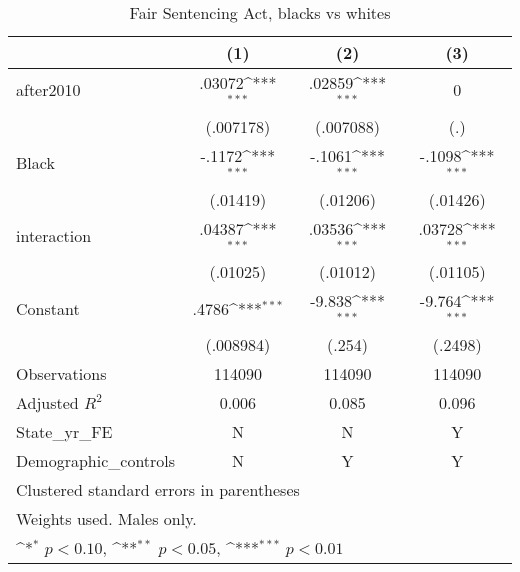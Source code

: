 \begin{table}[htbp]\centering
\tiny
\def\sym#1{\ifmmode^{#1}\else\(^{#1}\)\fi}
\caption{Fair Sentencing Act, blacks vs whites}
\begin{tabular}{l*{3}{c}}
\hline\hline
                    &\multicolumn{1}{c}{(1)}         &\multicolumn{1}{c}{(2)}         &\multicolumn{1}{c}{(3)}         \\
\hline
after2010           &      .03072\sym{***}&      .02859\sym{***}&           0         \\
                    &   (.007178)         &   (.007088)         &         (.)         \\
[1em]
Black               &      -.1172\sym{***}&      -.1061\sym{***}&      -.1098\sym{***}\\
                    &    (.01419)         &    (.01206)         &    (.01426)         \\
[1em]
interaction         &      .04387\sym{***}&      .03536\sym{***}&      .03728\sym{***}\\
                    &    (.01025)         &    (.01012)         &    (.01105)         \\
[1em]
Constant            &       .4786\sym{***}&      -9.838\sym{***}&      -9.764\sym{***}\\
                    &   (.008984)         &      (.254)         &     (.2498)         \\
\hline
Observations        &      114090         &      114090         &      114090         \\
Adjusted \(R^{2}\)  &       0.006         &       0.085         &       0.096         \\
State\_yr\_FE         &           N         &           N         &           Y         \\
Demographic\_controls&           N         &           Y         &           Y         \\
\hline\hline
\multicolumn{4}{l}{\footnotesize Clustered standard errors in parentheses}\\
\multicolumn{4}{l}{\footnotesize Weights used. Males only.}\\
\multicolumn{4}{l}{\footnotesize \sym{*} \(p<0.10\), \sym{**} \(p<0.05\), \sym{***} \(p<0.01\)}\\
\end{tabular}
\end{table}
